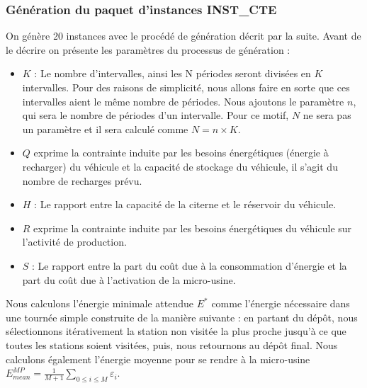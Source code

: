 {\subsubsection{Génération du paquet d'instances INST\_CTE}
On génère 20 instances avec le procédé de génération décrit par la suite. Avant de le décrire on présente les paramètres du processus de génération :
\begin{itemize}[label=$\square$]
	\item $K $ : Le nombre d'intervalles, ainsi les N périodes seront divisées en $K$ intervalles. Pour des raisons de
	simplicité, nous allons faire en sorte que ces intervalles aient le même nombre de périodes. Nous ajoutons le paramètre $n$, qui sera le nombre de périodes d'un intervalle.
	Pour ce motif, $N$ ne sera pas un paramètre et il sera calculé comme $N= n\times K$.
	\item $Q$ exprime la contrainte induite par les besoins énergétiques (énergie à recharger) du véhicule et la capacité de stockage du véhicule, il s'agit du
	nombre de recharges prévu.
	\item $H$ : Le rapport entre la capacité de la citerne et le réservoir du véhicule.
	\item $R$ exprime la contrainte induite par les besoins énergétiques du véhicule sur l'activité de production.
	\item $S$ : Le rapport entre la part du coût due à la consommation d'énergie et la part
	du coût due à l'activation de la micro-usine.
	
\end{itemize}


Nous calculons l'énergie minimale attendue $E^*$ comme l'énergie nécessaire dans une tournée simple construite de la
manière suivante : en partant du dépôt, nous sélectionnons itérativement la station non visitée la plus proche jusqu'à ce que toutes les stations soient visitées, puis, nous retournons au dépôt final. Nous calculons également l'énergie moyenne pour
se rendre à la micro-usine $E_{mean}^{MP}=\frac{1}{M+1}\sum_{ 0 \leq i \leq M}\varepsilon_i$.

}
